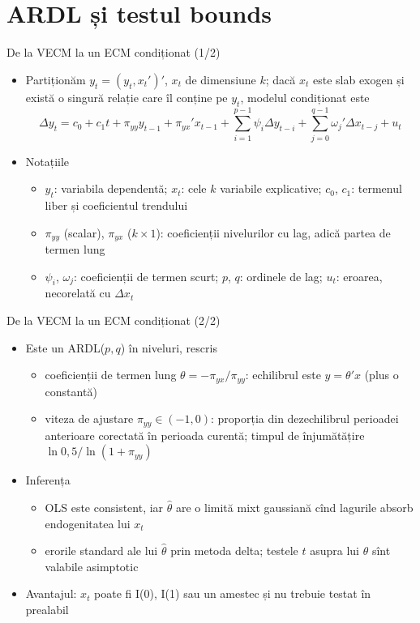 \section{ARDL și testul bounds}

\begin{frame}{De la VECM la un ECM condiționat (1/2)}
\itemsize{\small}
\begin{itemize}
    \item Partiționăm $y_t = (y_t, x_t')'$, $x_t$ de dimensiune $k$; dacă $x_t$ este slab exogen și există o singură relație care îl conține pe $y_t$, modelul condiționat este \[ \Delta y_t = c_0 + c_1t + \pi_{yy}y_{t-1} + \pi_{yx}'x_{t-1} + \sum_{i=1}^{p-1}\psi_i\Delta y_{t-i} + \sum_{j=0}^{q-1}\omega_j'\Delta x_{t-j} + u_t \]
    \item Notațiile 
    \begin{itemize}
        \item $y_t$: variabila dependentă; $x_t$: cele $k$ variabile explicative; $c_0$, $c_1$: termenul liber și coeficientul trendului
        \item $\pi_{yy}$ (scalar), $\pi_{yx}$ ($k\times 1$): coeficienții nivelurilor cu lag, adică partea de termen lung
        \item $\psi_i$, $\omega_j$: coeficienții de termen scurt; $p$, $q$: ordinele de lag; $u_t$: eroarea, necorelată cu $\Delta x_t$
    \end{itemize}
\end{itemize}
\end{frame}

\begin{frame}{De la VECM la un ECM condiționat (2/2)}
\itemsize{\small}
\begin{itemize}
    \item Este un ARDL($p, q$) în niveluri, rescris
    \begin{itemize}
        \item coeficienții de termen lung $\theta = -\pi_{yx}/\pi_{yy}$: echilibrul este $y = \theta'x$ (plus o constantă)
        \item viteza de ajustare $\pi_{yy} \in (-1, 0)$: proporția din dezechilibrul perioadei anterioare corectată în perioada curentă; timpul de înjumătățire $\ln 0{,}5/\ln(1 + \pi_{yy})$
    \end{itemize}
    \item Inferența
    \begin{itemize}
        \item OLS este consistent, iar $\hat\theta$ are o limită mixt gaussiană cînd lagurile absorb endogenitatea lui $x_t$ 
        \item erorile standard ale lui $\hat\theta$ prin metoda delta; testele $t$ asupra lui $\theta$ sînt valabile asimptotic
    \end{itemize}
    \item Avantajul: $x_t$ poate fi I(0), I(1) sau un amestec și nu trebuie testat în prealabil
\end{itemize}
\end{frame}

